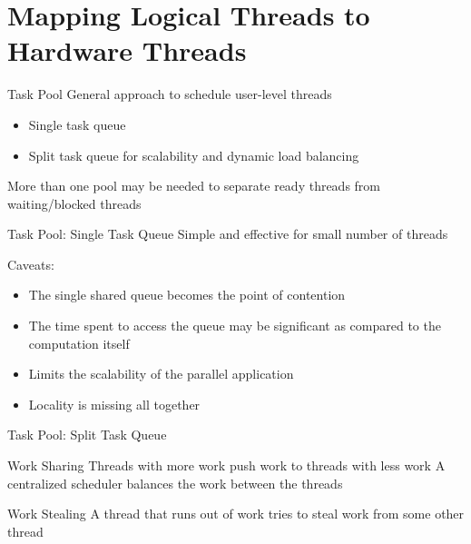 \documentclass[xcolor=dvipsnames,9pt,mathserif]{beamer}
\begin{document}
\section{Mapping Logical Threads to Hardware Threads}

\begin{frame}[c]{Task Pool}
  General approach to schedule user-level threads

  \begin{itemize}
  \item Single task queue
  \item Split task queue for scalability and dynamic load balancing
  \end{itemize}

  \bigskip
  More than one pool may be needed to separate ready threads
  from waiting/blocked threads
\end{frame}

\begin{frame}{Task Pool: Single Task Queue}
  Simple and effective for small number of threads

  \bigskip
  Caveats:
  \begin{itemize}
  \item The single shared queue becomes the point of contention
  \item The time spent to access the queue may be
    significant as compared to the computation itself
  \item Limits the scalability of the parallel application
  \item Locality is missing all together
  \end{itemize}
\end{frame}

\begin{frame}[c]{Task Pool: Split Task Queue}
  \begin{block}{Work Sharing}
    Threads with more work push work to threads with less work
    A centralized scheduler balances the work between the
    threads
  \end{block}

  \begin{block}{Work Stealing}
    A thread that runs out of work tries to steal work from some
    other thread
  \end{block}
\end{frame}
\end{document}
